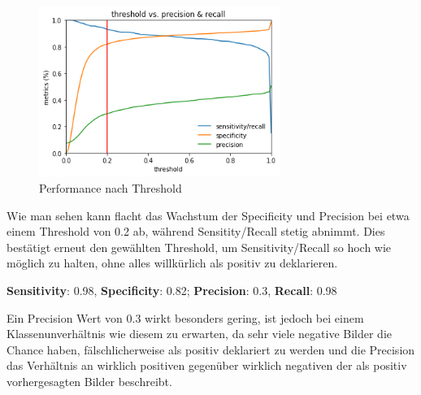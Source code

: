 \begin{figure}[H]
\label{pic:Eval}
\centering
\includegraphics[width=0.7\textwidth]{./pic/Klassifikation/eval.png}
\caption{Performance nach Threshold}
\end{figure}

Wie man sehen kann flacht das Wachstum der Specificity und Precision bei etwa einem Threshold von 0.2 ab, während Sensitity/Recall stetig abnimmt. Dies bestätigt erneut den gewählten Threshold, um Sensitivity/Recall so hoch wie möglich zu halten, ohne alles willkürlich als positiv zu deklarieren.

\textbf{Sensitivity}: 0.98, \textbf{Specificity}: 0.82; \textbf{Precision}: 0.3, \textbf{Recall}: 0.98

Ein Precision Wert von 0.3 wirkt besonders gering, ist jedoch bei einem Klassenunverhältnis wie diesem zu erwarten, da sehr viele negative Bilder die Chance haben, fälschlicherweise als positiv deklariert zu werden und die Precision das Verhältnis an wirklich positiven gegenüber wirklich negativen der als positiv vorhergesagten Bilder beschreibt.